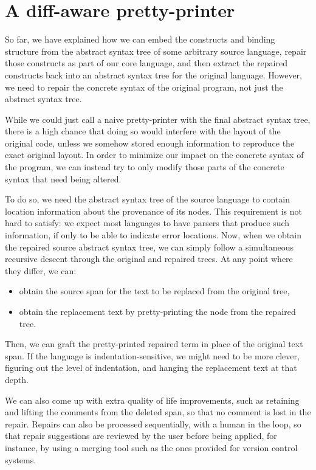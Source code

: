\section{A diff-aware pretty-printer}\label{coop-diff-pretty-printer}

So far, we have explained how we can embed the constructs and binding structure
from the abstract syntax tree of some arbitrary source language, repair those
constructs as part of our core language, and then extract the repaired
constructs back into an abstract syntax tree for the original language.
However, we need to repair the concrete syntax of the original program, not just
the abstract syntax tree.

While we could just call a naive pretty-printer with the final abstract syntax
tree, there is a high chance that doing so would interfere with the layout of
the original code, unless we somehow stored enough information to reproduce the
exact original layout.  In order to minimize our impact on the concrete syntax
of the program, we can instead try to only modify those parts of the concrete
syntax that need being altered.

To do so, we need the abstract syntax tree of the source language to contain
location information about the provenance of its nodes.  This requirement is not
hard to satisfy: we expect most languages to have parsers that produce such
information, if only to be able to indicate error locations.  Now, when we
obtain the repaired source abstract syntax tree, we can simply follow a
simultaneous recursive descent through the original and repaired trees.  At any
point where they differ, we can:

\begin{itemize}

  \item obtain the source span for the text to be replaced from the original
tree,

  \item obtain the replacement text by pretty-printing the node from the
repaired tree.

\end{itemize}

\noindent
Then, we can graft the pretty-printed repaired term in place of the original
text span.  If the language is indentation-sensitive, we might need to be more
clever, figuring out the level of indentation, and hanging the replacement
text at that depth.

We can also come up with extra quality of life improvements, such as retaining
and lifting the comments from the deleted span, so that no comment is lost in
the repair.  Repairs can also be processed sequentially, with a human in the
loop, so that repair suggestions are reviewed by the user before being applied,
for instance, by using a merging tool such as the ones provided for version
control systems.
